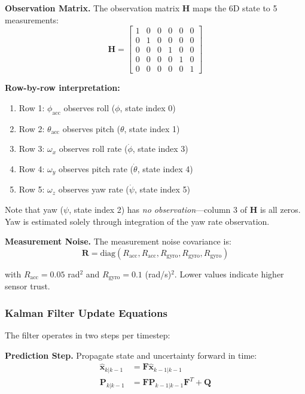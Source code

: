 \textbf{Observation Matrix.} The observation matrix $\mathbf{H}$ maps the 6D state to 5 measurements:
\begin{equation}
\mathbf{H} = \begin{bmatrix}
1 & 0 & 0 & 0 & 0 & 0 \\
0 & 1 & 0 & 0 & 0 & 0 \\
0 & 0 & 0 & 1 & 0 & 0 \\
0 & 0 & 0 & 0 & 1 & 0 \\
0 & 0 & 0 & 0 & 0 & 1
\end{bmatrix}
\label{eq:H_matrix}
\end{equation}

\textbf{Row-by-row interpretation:}
\begin{enumerate}
\item Row 1: $\phi_{\text{acc}}$ observes roll ($\phi$, state index 0)
\item Row 2: $\theta_{\text{acc}}$ observes pitch ($\theta$, state index 1)
\item Row 3: $\omega_x$ observes roll rate ($\dot{\phi}$, state index 3)
\item Row 4: $\omega_y$ observes pitch rate ($\dot{\theta}$, state index 4)
\item Row 5: $\omega_z$ observes yaw rate ($\dot{\psi}$, state index 5)
\end{enumerate}

Note that yaw ($\psi$, state index 2) has \textit{no observation}---column 3 of $\mathbf{H}$ is all zeros. Yaw is estimated solely through integration of the yaw rate observation.

\textbf{Measurement Noise.} The measurement noise covariance is:
\begin{equation}
\mathbf{R} = \text{diag}(R_{\text{acc}}, R_{\text{acc}}, R_{\text{gyro}}, R_{\text{gyro}}, R_{\text{gyro}})
\label{eq:R_matrix}
\end{equation}

with $R_{\text{acc}} = 0.05$ rad$^2$ and $R_{\text{gyro}} = 0.1$ (rad/s)$^2$. Lower values indicate higher sensor trust.

\subsubsection{Kalman Filter Update Equations}

The filter operates in two steps per timestep:

\textbf{Prediction Step.} Propagate state and uncertainty forward in time:
\begin{align}
\hat{\mathbf{x}}_{k|k-1} &= \mathbf{F} \hat{\mathbf{x}}_{k-1|k-1} \label{eq:predict_state} \\
\mathbf{P}_{k|k-1} &= \mathbf{F} \mathbf{P}_{k-1|k-1} \mathbf{F}^T + \mathbf{Q} \label{eq:predict_cov}
\end{align}

